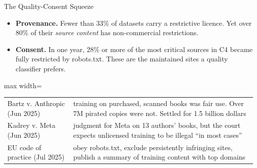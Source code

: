 \begin{frame}{The Quality-Consent Squeeze}
    \begin{itemize}\itemsep0.45em
        \item \textbf{Provenance.} Fewer than 33\% of datasets carry a restrictive licence. Yet over \alert{80\%} of their \emph{source content} has non-commercial restrictions.
        \item \textbf{Consent.} In one year, 28\% or more of the most critical sources in C4 became fully restricted by robots.txt. These are the maintained sites a quality classifier prefers.
    \end{itemize}
    \begin{center}
    \small
    \begin{adjustbox}{max width=\linewidth}\begin{tabular}{>{\raggedright\arraybackslash}p{3.6cm}>{\raggedright\arraybackslash}p{9.7cm}}
        \toprule
        Bartz v. Anthropic (Jun 2025) & training on purchased, scanned books was fair use. Over 7M pirated copies were not. Settled for 1.5 billion dollars \\
        Kadrey v. Meta (Jun 2025) & judgment for Meta on 13 authors' books, but the court expects unlicensed training to be illegal ``in most cases'' \\
        EU code of practice (Jul 2025) & obey robots.txt, exclude persistently infringing sites, publish a summary of training content with top domains \\
        \bottomrule
    \end{tabular}\end{adjustbox}
    \end{center}
\end{frame}

